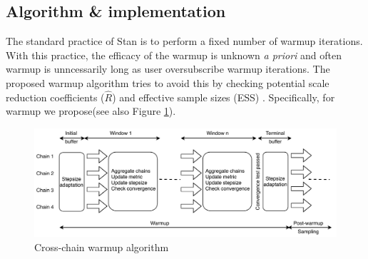 \documentclass[11pt, reqno, oneside]{amsart}
\begin{document}
\subsection{Algorithm \& implementation}
\label{sec:orgfce4604}
The standard practice of Stan is to perform a fixed number of warmup
iterations. With this practice, the efficacy of the warmup is unknown
\emph{a priori} and often warmup is unncessarily long as user oversubscribe warmup iterations.
The proposed warmup algorithm tries to avoid this by checking potential scale reduction
coefficients (\(\hat{R}\)) and effective sample sizes (ESS)
\cite{vehtari_rank-normalization_2019} . Specifically, for warmup we
propose(see also Figure \ref{cc-diagram}).
\begin{figure}[htbp]
\centering
\includegraphics[width=\textwidth]{./figure/cross_chain_diagram.pdf}
\caption{Cross-chain warmup algorithm \label{cc-diagram}}
\end{figure}
\end{document}
